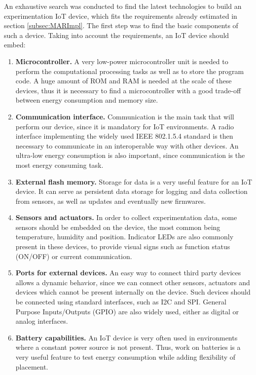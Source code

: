 An exhaustive search was conducted to find the latest technologies to build an experimentation IoT device, which fits the requirements already estimated in section \ref{subsec:MARImpl}.
The first step was to find the basic components of such a device.
Taking into account the requirements, an IoT device should embed:
\begin{enumerate}
	\item \textbf{Microcontroller.} A very low-power microcontroller unit is needed to perform the computational processing tasks as well as to store the program code. 
	A huge amount of ROM and RAM is needed at the scale of these devices, thus it is necessary to find a microcontroller with a good trade-off between energy consumption and memory size.
	\item \textbf{Communication interface.} Communication is the main task that will perform our device, since it is mandatory for IoT environments.
	A radio interface implementing the widely used IEEE 802.1.5.4 standard\cite{ieee802.15.4} is then necessary to communicate in an interoperable way with other devices.
	An ultra-low energy consumption is also important, since communication is the most energy consuming task.
	\item \textbf{External flash memory.} Storage for data is a very useful feature for an IoT device. It can serve as persistent data storage for logging and data collection from sensors, as well as updates and eventually new firmwares.
	\item \textbf{Sensors and actuators.} In order to collect experimentation data, some sensors should be embedded on the device, the most common being temperature, humidity and position.
	Indicator LEDs are also commonly present in these devices, to provide visual signs such as function status (ON/OFF) or current communication.
	\item \textbf{Ports for external devices.} An easy way to connect third party devices allows a dynamic behavior, since we can connect other sensors, actuators and devices which cannot be present internally on the device.
	Such devices should be connected using standard interfaces, such as I2C and SPI.
	General Purpose Inputs/Outputs (GPIO) are also widely used, either as digital or analog interfaces.
	\item \textbf{Battery capabilities.} An IoT device is very often used in environments where a constant power source is not present.
	Thus, work on batteries is a very useful feature to test energy consumption while adding flexibility of placement.
\end{enumerate}

